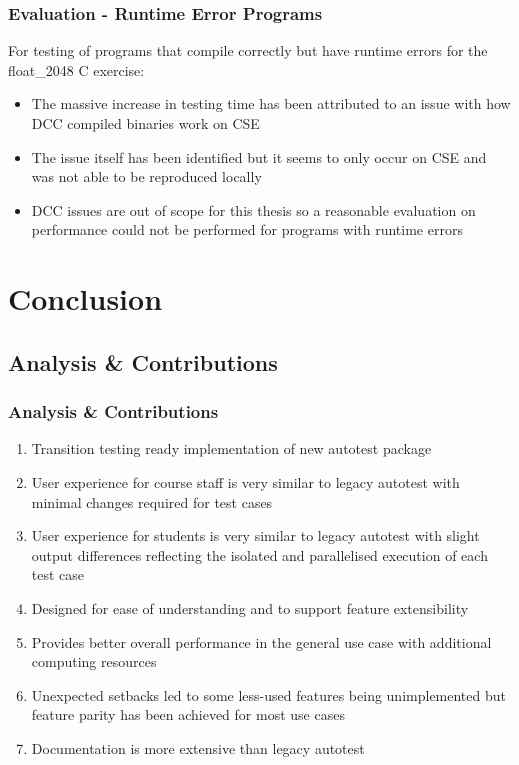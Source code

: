 \documentclass[xcolor, handout]{beamer}
\begin{document}
\begin{frame}
	\frametitle{Evaluation - Runtime Error Programs}
	For testing of programs that compile correctly but have runtime errors for the float\_2048 C exercise:\\
	\pause
	\begin{itemize}
		\setlength\itemsep{0.75em}
		\item The massive increase in testing time has been attributed to an issue with how DCC compiled binaries work on CSE
			\pause
		\item The issue itself has been identified but it seems to only occur on CSE and was not able to be reproduced locally
			\pause
		\item DCC issues are out of scope for this thesis so a reasonable evaluation on performance could not be performed for programs with runtime errors
	\end{itemize}
\end{frame}

\section{Conclusion}
\subsection{Analysis \& Contributions}
\begin{frame}
	\frametitle{Analysis \& Contributions}
	\begin{enumerate}
		\item Transition testing ready implementation of new autotest package
			\pause
		\item User experience for course staff is very similar to legacy autotest with minimal changes required for test cases
			\pause
		\item User experience for students is very similar to legacy autotest with slight output differences reflecting the isolated and parallelised execution of each test case
			\pause
		\item Designed for ease of understanding and to support feature extensibility
			\pause
		\item Provides better overall performance in the general use case with additional computing resources
			\pause
		\item Unexpected setbacks led to some less-used features being unimplemented but feature parity has been achieved for most use cases
			\pause
		\item Documentation is more extensive than legacy autotest
	\end{enumerate}
\end{frame}
\end{document}
